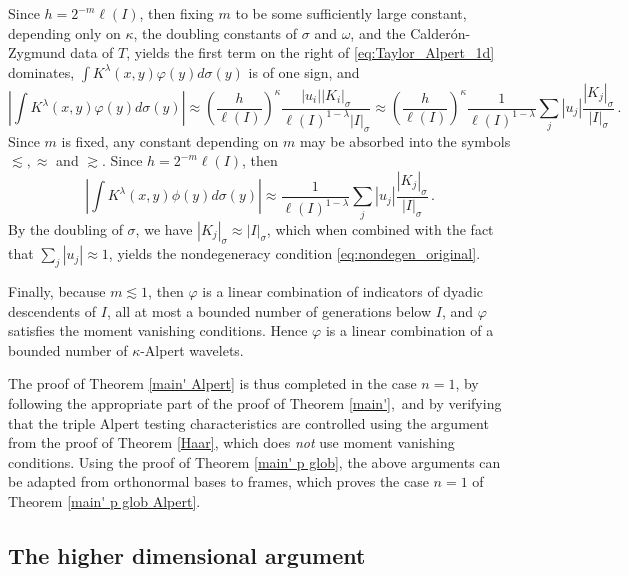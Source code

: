 \documentclass{amsart}%
\theoremstyle{plain}
\numberwithin{equation}{section}
\begin{document}
Since $h = 2^{-m} \ell \left (I \right)$, then fixing $m$ to be some sufficiently large constant, depending only on $\kappa$, the doubling constants of $\sigma$ and $\omega$, and the Calder\'on-Zygmund data of $T$, yields the first term on the right of \eqref{eq:Taylor_Alpert_1d} dominates, $\int K^{\lambda} (x,y) \varphi(y) d \sigma(y)$ is of one sign, and 
\[
	\left | \int K^{\lambda} (x,y) \varphi(y) d \sigma(y) \right | \approx \left ( \frac{h}{\ell \left(I \right )} \right)^{\kappa} \frac{ |u_i| \left | K_i \right |_{\sigma}}{ \ell \left ( I \right )^{1- \lambda} \left | I \right |_{\sigma} } \approx \left ( \frac{h}{\ell \left(I \right )} \right)^{\kappa} \frac{1}{\ell \left ( I \right )^{1- \lambda}}  \sum\limits_j |u_j| \frac{\left | K_j \right |_{\sigma}}{ \left | I \right |_{\sigma}} \, .
\]
Since $m$ is fixed, any constant depending on $m$ may be absorbed into the symbols $\lesssim, \approx $ and $\gtrsim$. Since $h = 2^{-m} \ell \left (I \right)$, then 
\[
	\left | \int K ^{\lambda} (x,y) \phi(y) d \sigma(y) \right | \approx \frac{1}{\ell \left (I \right )^{1- \lambda}}   \sum\limits_j |u_j|  \frac{\left | K_j \right |_{\sigma} }{ \left | I \right |_{\sigma} } \, .
\]
By the doubling of $\sigma$, we have $\left | K_j \right |_{\sigma} \approx \left | I \right |_{\sigma}$, which when combined with the fact that $\sum\limits_j |u_j| \approx 1$, yields the nondegeneracy condition \eqref{eq:nondegen_original}.

Finally, because $m \lesssim 1$, then $\varphi$ is a linear combination of indicators of dyadic descendents of $I$, all at most a bounded number of generations below $I$, and $\varphi$ satisfies the moment vanishing conditions. Hence $\varphi$ is a linear combination of a bounded number of $\kappa$-Alpert wavelets.

The proof of Theorem \ref{main' Alpert} is thus completed in the case $n=1$, by
following the appropriate part of the proof of Theorem \ref{main'},\ and by
verifying that the triple Alpert testing characteristics are controlled using
the argument from the proof of Theorem \ref{Haar}, which does \emph{not} use
moment vanishing conditions. Using the proof of Theorem \ref{main' p glob}, the above arguments
can be adapted from orthonormal bases to frames, which proves the case $n=1$
of Theorem \ref{main' p glob Alpert}.

\subsection{The higher dimensional argument}
\end{document}
